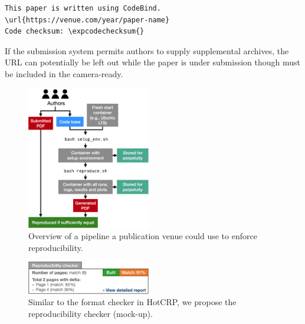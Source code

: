 \vspace{0.2cm}
\begin{mdframed}[style=annotex]
\begin{verbatim}
This paper is written using CodeBind.
\url{https://venue.com/year/paper-name}
Code checksum: \expcodechecksum{}
\end{verbatim}
\end{mdframed}

\noindent If the submission system permits authors to supply supplemental archives, the URL can potentially be left out while the paper is under submission though must be included in the camera-ready.

\begin{figure}
    \includegraphics[width=0.48\textwidth]{figures/venue-reproducibility-pipeline.png}
    \caption{Overview of a pipeline a publication venue could use to enforce reproducibility.}
    \label{fig:venue-reproducibility-pipeline}
\end{figure}

\begin{figure}
    \includegraphics[width=0.48\textwidth]{figures/reproducibility-checker.png}
    \caption{Similar to the format checker in HotCRP, we propose the reproducibility checker (mock-up).}
    \label{fig:reproducibility-checker}
\end{figure}

